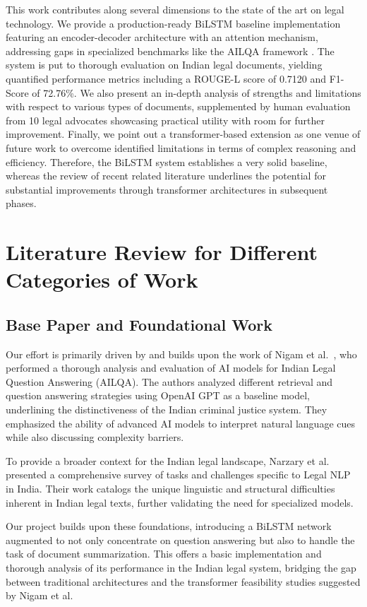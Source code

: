 \documentclass{llncs}
\begin{document}
This work contributes along several dimensions to the state of the art on legal technology. We provide a production-ready BiLSTM baseline implementation featuring an encoder-decoder architecture with an attention mechanism, addressing gaps in specialized benchmarks like the AILQA framework \cite{ailqa2024}. The system is put to thorough evaluation on Indian legal documents, yielding quantified performance metrics including a ROUGE-L score of 0.7120 and F1-Score of 72.76\%. We also present an in-depth analysis of strengths and limitations with respect to various types of documents, supplemented by human evaluation from 10 legal advocates showcasing practical utility with room for further improvement. Finally, we point out a transformer-based extension as one venue of future work to overcome identified limitations in terms of complex reasoning and efficiency. Therefore, the BiLSTM system establishes a very solid baseline, whereas the review of recent related literature underlines the potential for substantial improvements through transformer architectures in subsequent phases.
\section{Literature Review for Different Categories of Work}

\subsection{Base Paper and Foundational Work}

Our effort is primarily driven by and builds upon the work of Nigam et al.~\cite{nigam2023legal}, who performed a thorough analysis and evaluation of AI models for Indian Legal Question Answering (AILQA). The authors analyzed different retrieval and question answering strategies using OpenAI GPT as a baseline model, underlining the distinctiveness of the Indian criminal justice system. They emphasized the ability of advanced AI models to interpret natural language cues while also discussing complexity barriers. 

To provide a broader context for the Indian legal landscape, Narzary et al.~\cite{narzary2025survey} presented a comprehensive survey of tasks and challenges specific to Legal NLP in India. Their work catalogs the unique linguistic and structural difficulties inherent in Indian legal texts, further validating the need for specialized models.

Our project builds upon these foundations, introducing a BiLSTM network augmented to not only concentrate on question answering but also to handle the task of document summarization. This offers a basic implementation and thorough analysis of its performance in the Indian legal system, bridging the gap between traditional architectures and the transformer feasibility studies suggested by Nigam et al.
\end{document}
